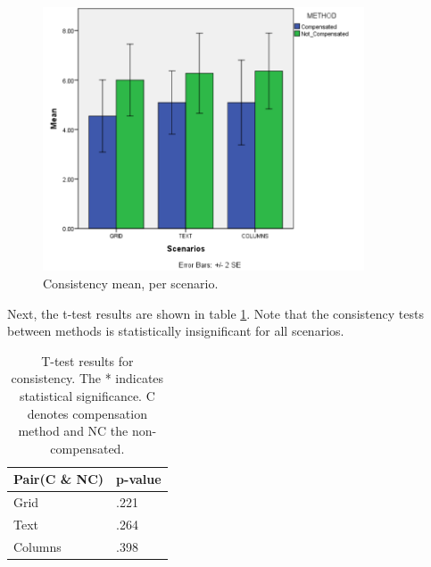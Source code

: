 \documentclass[]{article}
\begin{document}
\begin{figure}[!h]
    \centering
    \includegraphics[width=0.85\textwidth]{figures/results/Consistency_Graph.PNG}
    \caption{Consistency mean, per scenario.}
    \label{fig:Consistency_Graph}
\end{figure}

Next, the t-test results are shown in table \ref{table:Consistency_Test}. Note that the consistency tests between methods is statistically insignificant for all scenarios.


\begin{table}
\begin{center}
    \begin{tabular}{ | l | l |}
    \hline
    \textbf{Pair(C \& NC)} & \textbf{p-value }\\ \hline
    Grid & .221 \\ \hline
    Text & .264 \\ \hline
    Columns & .398 \\ 
    \hline
    \end{tabular}      
\end{center}
\caption{T-test results for consistency. The * indicates statistical significance. C denotes compensation method and NC the non-compensated.}
\label{table:Consistency_Test}
\end{table}
\end{document}
